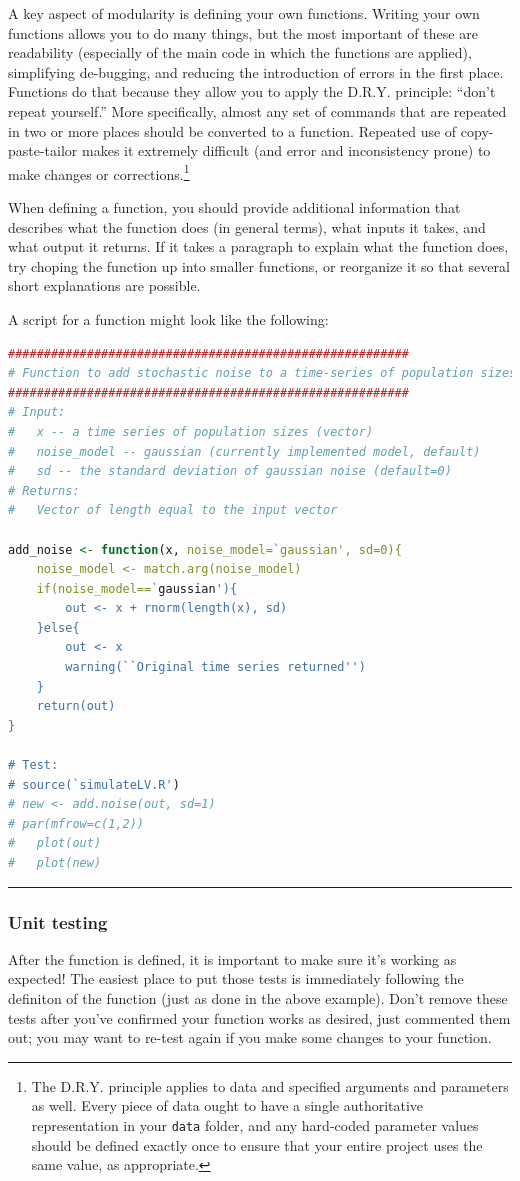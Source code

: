 \documentclass[12pt,letterpaper]{article}
\begin{document}
A key aspect of modularity is defining your own functions.
Writing your own functions allows you to do many things, but the most important of these are readability (especially of the main code in which the functions are applied), simplifying de-bugging, and reducing the introduction of errors in the first place.
Functions do that because they allow you to apply the D.R.Y. principle: 
``don't repeat yourself.''
More specifically, almost any set of commands that are repeated in two or more places should be converted to a function.
Repeated use of copy-paste-tailor makes it extremely difficult (and error and 
inconsistency prone) to make changes or corrections.\footnote{The D.R.Y. 
principle applies to data and specified arguments and parameters as well.  
Every piece of data ought to have a single authoritative representation in 
your \texttt{data} folder, and any hard-coded parameter values should be 
defined exactly once to ensure that your entire project uses the same value, 
as appropriate.}


When defining a function, you should provide additional information that describes what the function does (in general terms), what inputs it takes, and what output it returns.
If it takes a paragraph to explain what the function does, try choping the function up into smaller functions, or reorganize it so that several short explanations are possible.

A script for a function might look like the following:

\begin{lstlisting}[language=R]
########################################################
# Function to add stochastic noise to a time-series of population sizes.
########################################################
# Input:
#	x -- a time series of population sizes (vector)
#	noise_model -- gaussian (currently implemented model, default)
# 	sd -- the standard deviation of gaussian noise (default=0)
# Returns:
#	Vector of length equal to the input vector

add_noise <- function(x, noise_model=`gaussian', sd=0){
	noise_model <- match.arg(noise_model)
	if(noise_model==`gaussian'){
		out <- x + rnorm(length(x), sd)
	}else{
		out <- x
		warning(``Original time series returned'')
	}
	return(out)
}

# Test:
# source(`simulateLV.R')
# new <- add.noise(out, sd=1)
# par(mfrow=c(1,2))
#	plot(out)
#	plot(new)
\end{lstlisting}
\noindent\rule{12cm}{0.4pt}

\subsubsection{Unit testing}
After the function is defined, it is important to make sure it's working as expected!
The easiest place to put those tests is immediately following the definiton of the function (just as done in the above example).
Don't remove these tests after you've confirmed your function works as desired, just commented them out;
you may want to re-test again if you make some changes to your function.
\end{document}
